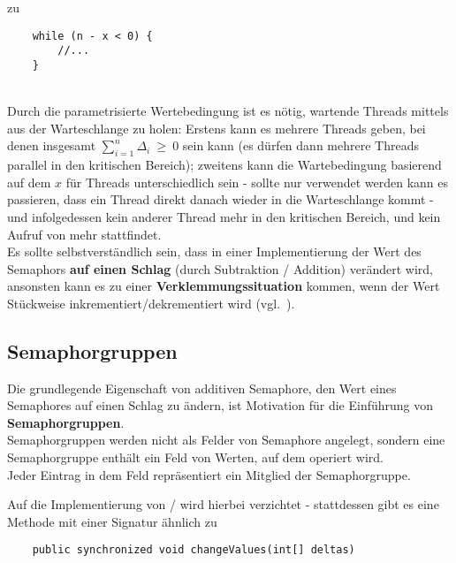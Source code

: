 zu

\begin{verbatim}
    while (n - x < 0) {
        //...
    }
\end{verbatim}\\

\noindent
Durch die parametrisierte Wertebedingung ist es nötig, wartende Threads mittels  aus der Warteschlange zu holen: Erstens kann es mehrere Threads geben, bei denen insgesamt $\sum_{i=1}^{n} \Delta_i\ \geq\ 0$ sein kann (es dürfen dann mehrere Threads parallel in den kritischen Bereich); zweitens kann die Wartebedingung basierend auf dem $x$ für Threads unterschiedlich sein - sollte nur  verwendet werden kann es passieren, dass ein Thread direkt danach wieder in die Warteschlange kommt - und infolgedessen kein anderer Thread mehr in den kritischen Bereich, und kein Aufruf von  mehr stattfindet.\\

\noindent
Es sollte selbstverständlich sein, dass in einer Implementierung der Wert des Semaphors \textbf{auf einen Schlag} (durch Subtraktion / Addition) verändert wird, ansonsten kann es zu einer \textbf{Verklemmungssituation} kommen, wenn der Wert Stückweise inkrementiert/dekrementiert wird (vgl.~\cite[109]{Oec22}).

\subsection{Semaphorgruppen}

Die grundlegende Eigenschaft von additiven Semaphore, den Wert eines Semaphores auf einen Schlag zu ändern, ist Motivation für die Einführung von \textbf{Semaphorgruppen}.\\

\noindent
Semaphorgruppen werden nicht als Felder von Semaphore angelegt, sondern eine Semaphorgruppe enthält ein Feld von Werten, auf dem operiert wird.\\

\noindent
Jeder Eintrag in dem Feld repräsentiert ein Mitglied der Semaphorgruppe.


\noindent
Auf die Implementierung von / wird hierbei verzichtet - stattdessen gibt es eine Methode mit einer Signatur ähnlich zu

\begin{verbatim}
    public synchronized void changeValues(int[] deltas)
\end{verbatim}\\

